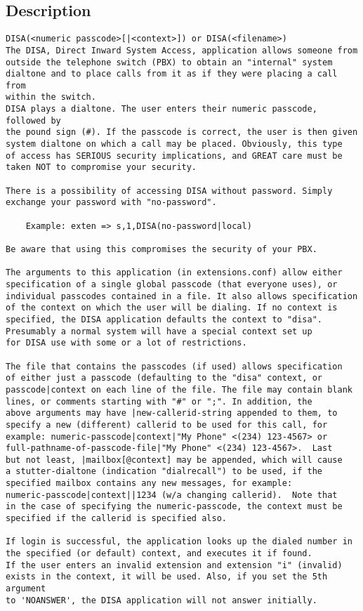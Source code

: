 \subsection{Description}
\begin{verbatim}
DISA(<numeric passcode>[|<context>]) or DISA(<filename>)
The DISA, Direct Inward System Access, application allows someone from 
outside the telephone switch (PBX) to obtain an "internal" system 
dialtone and to place calls from it as if they were placing a call from 
within the switch.
DISA plays a dialtone. The user enters their numeric passcode, followed by
the pound sign (#). If the passcode is correct, the user is then given
system dialtone on which a call may be placed. Obviously, this type
of access has SERIOUS security implications, and GREAT care must be
taken NOT to compromise your security.

There is a possibility of accessing DISA without password. Simply
exchange your password with "no-password".

    Example: exten => s,1,DISA(no-password|local)

Be aware that using this compromises the security of your PBX.

The arguments to this application (in extensions.conf) allow either
specification of a single global passcode (that everyone uses), or
individual passcodes contained in a file. It also allows specification
of the context on which the user will be dialing. If no context is
specified, the DISA application defaults the context to "disa".
Presumably a normal system will have a special context set up
for DISA use with some or a lot of restrictions. 

The file that contains the passcodes (if used) allows specification
of either just a passcode (defaulting to the "disa" context, or
passcode|context on each line of the file. The file may contain blank
lines, or comments starting with "#" or ";". In addition, the
above arguments may have |new-callerid-string appended to them, to
specify a new (different) callerid to be used for this call, for
example: numeric-passcode|context|"My Phone" <(234) 123-4567> or 
full-pathname-of-passcode-file|"My Phone" <(234) 123-4567>.  Last
but not least, |mailbox[@context] may be appended, which will cause
a stutter-dialtone (indication "dialrecall") to be used, if the
specified mailbox contains any new messages, for example:
numeric-passcode|context||1234 (w/a changing callerid).  Note that
in the case of specifying the numeric-passcode, the context must be
specified if the callerid is specified also.

If login is successful, the application looks up the dialed number in
the specified (or default) context, and executes it if found.
If the user enters an invalid extension and extension "i" (invalid) 
exists in the context, it will be used. Also, if you set the 5th argument
to 'NOANSWER', the DISA application will not answer initially.

\end{verbatim}


